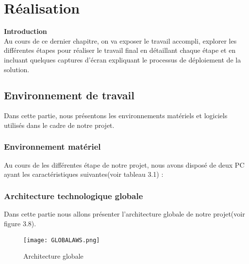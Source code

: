 \chapter{\Large Réalisation}

\textbf{\huge Introduction} \\[1cm]

Au cours de ce dernier chapitre, on va exposer le travail accompli, explorer les différentes étapes pour réaliser le travail final en détaillant chaque étape et en incluant quelques captures d'écran expliquant le processus de déploiement de la solution. \\[0.1cm]
\section{\selectfont\Large  Environnement de travail }
Dans cette partie, nous présentons les environnements matériels et logiciels utilisés dans le
cadre de notre projet.
\subsection{\selectfont\Large  Environnement matériel }
Au cours de les différentes étape de notre projet, nous avons disposé de deux PC ayant les
caractéristiques suivantes(voir tableau 3.1) :
\begin{center}
    \begin{table}[H]  
      \centering
  \caption{Caractéristiques des ordinateurs}
  \end{table}
  \end{center}
  \subsection{\selectfont\Large Architecture technologique globale}
   Dans cette partie nous allons présenter l'architecture globale de notre projet(voir figure 3.8).
\begin{landscape}
  \begin{figure}[htbp]
    \centering
  \texttt{[image: GLOBALAWS.png]}  
    \caption{Architecture globale}
  \end{figure}
\end{landscape}
